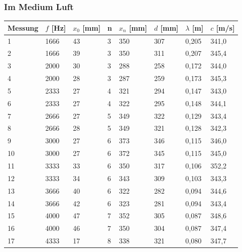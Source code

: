 \documentclass{scrartcl}
\begin{document}
\subsubsection{Im Medium Luft}
\begin{table}[h!]
\begin{tabular}{l|l|l|l|l|l|l|l}
Messung & $f$ {[}Hz{]} & $x_{0}$ [mm] & n & $x_{n}$ [mm] & $d$ [mm]   & $\lambda$ [m]      & $c$ [m/s]      \\
\hline
1       & 1666       & 43                & 3 & 350               & 307 & 0,205 & 341,0 \\
2       & 1666       & 39                & 3 & 350               & 311 & 0,207 & 345,4 \\
3       & 2000       & 30                & 3 & 288               & 258 & 0,172 & 344,0 \\
4       & 2000       & 28                & 3 & 287               & 259 & 0,173 & 345,3 \\
5       & 2333       & 27                & 4 & 321               & 294 & 0,147 & 343,0 \\
6       & 2333       & 27                & 4 & 322               & 295 & 0,148 & 344,1 \\
7       & 2666       & 27                & 5 & 349               & 322 & 0,129 & 343,4 \\
8       & 2666       & 28                & 5 & 349               & 321 & 0,128 & 342,3 \\
9       & 3000       & 27                & 6 & 373               & 346 & 0,115 & 346,0 \\
10      & 3000       & 27                & 6 & 372               & 345 & 0,115 & 345,0 \\
11      & 3333       & 33                & 6 & 350               & 317 & 0,106 & 352,2 \\
12      & 3333       & 34                & 6 & 343               & 309 & 0,103 & 343,3 \\
13      & 3666       & 40                & 6 & 322               & 282 & 0,094 & 344,6 \\
14      & 3666       & 42                & 6 & 323               & 281 & 0,094 & 343,4 \\
15      & 4000       & 47                & 7 & 352               & 305 & 0,087 & 348,6 \\
16      & 4000       & 46                & 7 & 350               & 304 & 0,087 & 347,4 \\
17      & 4333       & 17                & 8 & 338               & 321 & 0,080 & 347,7 \\

\end{tabular}
\end{table}
\end{document}
